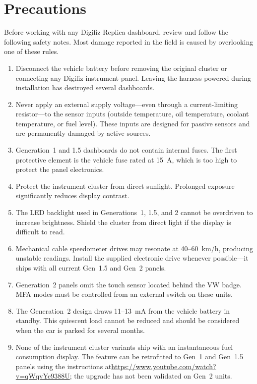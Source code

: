 \chapter{Precautions} \label{ch:precautions}

Before working with any Digifiz Replica dashboard, review and follow the following safety notes.
Most damage reported in the field is caused by overlooking one of these rules.

\begin{enumerate}
    \item Disconnect the vehicle battery before removing the original cluster or connecting any Digifiz instrument panel.
          Leaving the harness powered during installation has destroyed several dashboards.
    \item Never apply an external supply voltage---even through a current-limiting resistor---to the sensor inputs (outside temperature, oil temperature, coolant temperature, or fuel level).
          These inputs are designed for passive sensors and are permanently damaged by active sources.
    \item Generation~1 and 1.5 dashboards do not contain internal fuses.
          The first protective element is the vehicle fuse rated at 15~A, which is too high to protect the panel electronics.
    \item Protect the instrument cluster from direct sunlight.
          Prolonged exposure significantly reduces display contrast.
    \item The LED backlight used in Generations~1, 1.5, and 2 cannot be overdriven to increase brightness.
          Shield the cluster from direct light if the display is difficult to read.
    \item Mechanical cable speedometer drives may resonate at 40--60~km/h, producing unstable readings.
          Install the supplied electronic drive whenever possible---it ships with all current Gen~1.5 and Gen~2 panels.
    \item Generation~2 panels omit the touch sensor located behind the VW badge.
          MFA modes must be controlled from an external switch on these units.
    \item The Generation~2 design draws 11--13~mA from the vehicle battery in standby.
          This quiescent load cannot be reduced and should be considered when the car is parked for several months.
    \item None of the instrument cluster variants ship with an instantaneous fuel consumption display.
          The feature can be retrofitted to Gen~1 and Gen~1.5 panels using the instructions at\newline\url{https://www.youtube.com/watch?v=qWqvYc9388U}; the upgrade has not been validated on Gen~2 units.
\end{enumerate}

